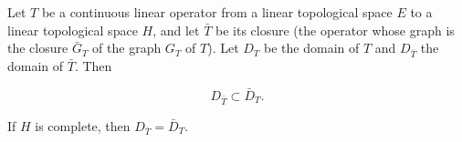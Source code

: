 Let $T$ be a continuous linear operator from a linear topological space $E$ to a linear topological space $H$, and let $\bar{T}$ be its closure (the operator whose graph is the closure $\bar{G}_T$ of the graph $G_T$ of $T$). Let $D_T$ be the domain of $T$ and $D_{\bar{T}}$ the domain of $\bar{T}$. Then

$$
D_{\bar{T}} \subset \bar{D}_T.
$$

If $H$ is complete, then $D_{\bar{T}} = \bar{D}_T$.
